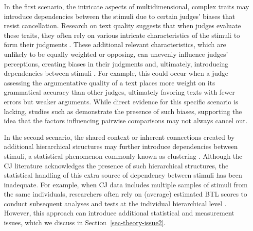 \documentclass[
  authoryear,
  preprint,
  1p]{elsarticle}
\begin{document}
In the first scenario, the intricate aspects of multidimensional,
complex traits may introduce dependencies between the stimuli due to
certain judges' biases that resist cancellation. Research on text
quality suggests that when judges evaluate these traits, they often rely
on various intricate characteristics of the stimuli to form their
judgments
\citep{vanDaal_et_al_2016, Lesterhuis_2018, Chambers_et_al_2022}. These
additional relevant characteristics, which are unlikely to be equally
weighted or opposing, can unevenly influence judges' perceptions,
creating biases in their judgments and, ultimately, introducing
dependencies between stimuli
\citep[pp.~346]{vanderLinden_et_al_2017_II}. For example, this could
occur when a judge assessing the argumentative quality of a text places
more weight on its grammatical accuracy than other judges, ultimately
favoring texts with fewer errors but weaker arguments. While direct
evidence for this specific scenario is lacking, studies such as
\citet{Pollitt_et_al_2003} demonstrate the presence of such biases,
supporting the idea that the factors influencing pairwise comparisons
may not always cancel out.

In the second scenario, the shared context or inherent connections
created by additional hierarchical structures may further introduce
dependencies between stimuli, a statistical phenomenon commonly known as
clustering \citep{Everitt_et_al_2010}. Although the CJ literature
acknowledges the presence of such hierarchical structures, the
statistical handling of this extra source of dependency between stimuli
has been inadequate. For example, when CJ data includes multiple samples
of stimuli from the same individuals, researchers often rely on
(average) estimated BTL scores to conduct subsequent analyses and tests
at the individual hierarchical level
\citep{Bramley_et_al_2019, Boonen_et_al_2020, Bouwer_et_al_2023, vanDaal_et_al_2017, Jones_et_al_2019, Gijsen_et_al_2021}.
However, this approach can introduce additional statistical and
measurement issues, which we discuss in Section~\ref{sec-theory-issue2}.
\end{document}
